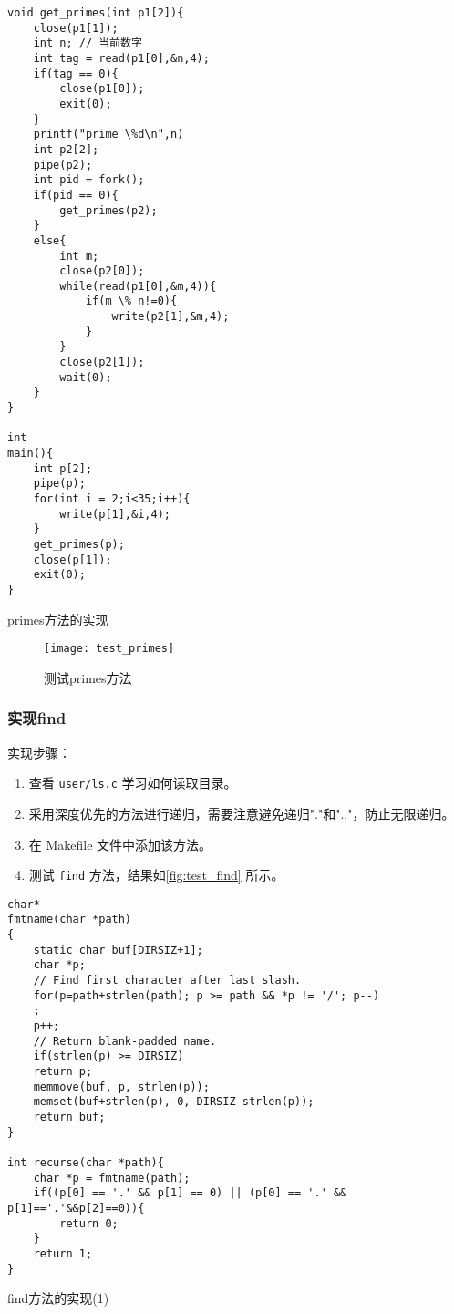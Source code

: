 \begin{listing}[!htb]
	\begin{verbatim}
void get_primes(int p1[2]){
    close(p1[1]);
    int n; // 当前数字
    int tag = read(p1[0],&n,4);
    if(tag == 0){
        close(p1[0]);
        exit(0);
    }
    printf("prime \%d\n",n)
    int p2[2];
    pipe(p2);
    int pid = fork();
    if(pid == 0){
        get_primes(p2);
    }
    else{
        int m;
        close(p2[0]);
        while(read(p1[0],&m,4)){
            if(m \% n!=0){
                write(p2[1],&m,4);           
            }
        }
        close(p2[1]);
        wait(0);
    }
}

int
main(){
    int p[2];
    pipe(p);
    for(int i = 2;i<35;i++){
        write(p[1],&i,4);
    }
    get_primes(p);
    close(p[1]);
    exit(0);
}
	\end{verbatim}
	\caption{primes方法的实现}\label{lst:primes}
\end{listing}

\begin{figure}[!htb]
	\centering
	\texttt{[image: test\_primes]}
	\caption{测试primes方法}
	\label{fig:test_primes}
\end{figure}

\subsubsection{实现find}

实现步骤：
\begin{enumerate}
	\item 查看 \texttt{user/ls.c} 学习如何读取目录。
	\item 采用深度优先的方法进行递归，需要注意避免递归"."和".."，防止无限递归。
	\item 在 Makefile 文件中添加该方法。
	\item 测试 \texttt{find} 方法，结果如\cref{fig:test_find} 所示。
\end{enumerate}

\begin{listing}[!htb]
	\begin{verbatim}
char*
fmtname(char *path)
{
    static char buf[DIRSIZ+1];
    char *p;
    // Find first character after last slash.
    for(p=path+strlen(path); p >= path && *p != '/'; p--)
    ;
    p++;
    // Return blank-padded name.
    if(strlen(p) >= DIRSIZ)
    return p;
    memmove(buf, p, strlen(p));
    memset(buf+strlen(p), 0, DIRSIZ-strlen(p));
    return buf;
}

int recurse(char *path){
    char *p = fmtname(path);
    if((p[0] == '.' && p[1] == 0) || (p[0] == '.' && p[1]=='.'&&p[2]==0)){
        return 0;
    }
    return 1;
}
	\end{verbatim}
	\caption{find方法的实现(1)}\label{lst:find1}
\end{listing}

